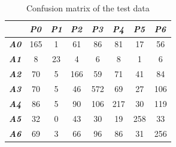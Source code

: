 \documentclass[12pt,twoside]{article}
\begin{document}
\begin{table}[!htbp]
\centering
\begin{tabular}{|l|c|c|c|c|c|c|c|}
\hline
                     & \multicolumn{1}{l|}{\textit{\textbf{P0}}} & \multicolumn{1}{l|}{\textit{\textbf{P1}}} & \multicolumn{1}{l|}{\textit{\textbf{P2}}} & \multicolumn{1}{l|}{\textit{\textbf{P3}}} & \multicolumn{1}{l|}{\textit{\textbf{P4}}} & \multicolumn{1}{l|}{\textit{\textbf{P5}}} & \multicolumn{1}{l|}{\textit{\textbf{P6}}} \\ \hline
\textit{\textbf{A0}} & 165                                       & 1                                         & 61                                        & 86                                        & 81                                        & 17                                        & 56                                        \\ \hline
\textit{\textbf{A1}} & 8                                         & 23                                        & 4                                         & 6                                         & 8                                         & 1                                         & 6                                         \\ \hline
\textit{\textbf{A2}} & 70                                        & 5                                         & 166                                       & 59                                        & 71                                        & 41                                        & 84                                        \\ \hline
\textit{\textbf{A3}} & 70                                        & 5                                         & 46                                        & 572                                       & 69                                        & 27                                        & 106                                       \\ \hline
\textit{\textbf{A4}} & 86                                        & 5                                         & 90                                        & 106                                       & 217                                       & 30                                        & 119                                       \\ \hline
\textit{\textbf{A5}} & 32                                        & 0                                         & 43                                        & 30                                        & 19                                        & 258                                       & 33                                        \\ \hline
\textit{\textbf{A6}} & 69                                        & 3                                         & 66                                        & 96                                        & 86                                        & 31                                        & 256                                       \\ \hline
\end{tabular}
\caption{Confusion matrix of the test data}
\label{confusion}
\end{table}
\end{document}
